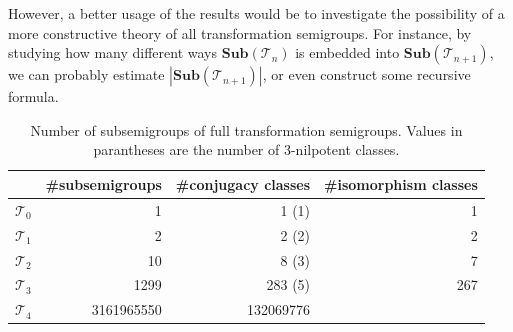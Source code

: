 \documentclass{amsart}
\newcommand{\cT}{{\mathcal T}}
\newcommand{\Sub}{\mathbf{Sub}}
\theoremstyle{plain}
\theoremstyle{definition}
\begin{document}
However, a better usage of the results would be to investigate the possibility of a more constructive theory of all transformation semigroups.
For instance, by studying how many different ways $\Sub(\cT_n)$ is embedded into $\Sub(\cT_{n+1})$, we can probably estimate $|\Sub(\cT_{n+1})|$, or even construct some recursive formula.
\begin{table}
\renewcommand{\arraystretch}{1}
\begin{tabular}{|c|r|r|r|}
\hline
 & \#subsemigroups & \#conjugacy classes & \#isomorphism classes \\
\hline
$\cT_0$ & 1  & 1 (1)& 1\\
\hline
$\cT_1$ & 2  & 2 (2)& 2\\
\hline
$\cT_2$ & 10  & 8 (3)& 7\\
\hline
$\cT_3$ & 1299 & 283 (5)& 267\\
\hline
$\cT_4$ & 3161965550 & 132069776 & \\
\hline
\end{tabular}
\caption{Number of subsemigroups of full transformation semigroups. Values in parantheses are the number of 3-nilpotent classes.}
\end{table}




\end{document}
